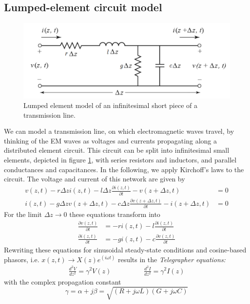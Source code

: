 \subsection{Lumped-element circuit model}
\begin{figure}
	\centering
	\includegraphics[width=0.4\linewidth]{chapter-theory/figs-RF/TL_lumped}
	\caption{Lumped element model of an infinitesimal short piece of a transmission line.}
	\label{fig:tllumped}
\end{figure}
We can model a transmission line, on which electromagnetic waves travel, by thinking of the EM waves as voltages and currents propagating along a distributed element circuit. This circuit can be split into infinitesimal small elements, depicted in figure \ref{fig:tllumped}, with series resistors and inductors, and parallel conductances and capacitances. In the following, we apply Kirchoff's laws to the circuit. The voltage and current of this network are given by
\begin{align}
v(z,t) - r\Delta z i(z,t) - l\Delta z\frac{\partial i(z,t)}{\partial t}-v(z+\Delta z,t) &=0 \\%
i(z,t) - g\Delta z v(z+\Delta z, t) - c\Delta z\frac{\partial v(z+\Delta z,t)}{\partial t} - i(z+\Delta z,t) &=0
\end{align}
For the limit $\Delta z\rightarrow0$ these equations transform into 
\begin{align}
\frac{\partial v(z,t)}{\partial t} &= -ri(z,t)-l\frac{\partial i(z,t)}{\partial t} \\%
\frac{\partial i(z,t)}{\partial t} &= -gi(z,t)-c\frac{\partial v(z,t)}{\partial t}
\end{align}
Rewriting these equations for sinusoidal steady-state conditions and cosine-based phasors, i.e. $x(z,t) \rightarrow X(z)e^(i\omega t)$ results in the \textit{Telegrapher equations:}
\begin{align}
\frac{d^2V}{dz^2} = \gamma^2V(z) \hspace{2cm} \frac{d^2I}{dz^2} = \gamma^2I(z)
\label{eq:telegraph}
\end{align}
with the complex propagation constant
\begin{equation}
\gamma = \alpha + j\beta =\sqrt{(R+j\omega L)(G+j\omega C)}
\label{eq:gamma}
\end{equation}
